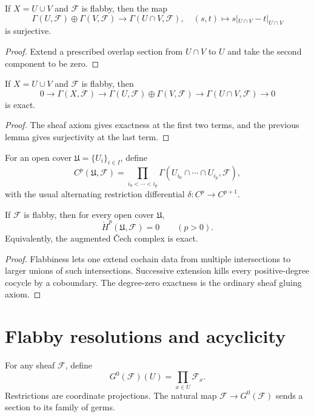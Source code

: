\begin{lemma}\label{lemma:vi46-two-open-surj}
If $X=U\cup V$ and $\mathcal F$ is flabby, then the map
\[
\Gamma(U,\mathcal F)\oplus\Gamma(V,\mathcal F)
\longrightarrow\Gamma(U\cap V,\mathcal F),
\quad (s,t)\longmapsto s|_{U\cap V}-t|_{U\cap V}
\]
is surjective.
\begin{proof}
Extend a prescribed overlap section from $U\cap V$ to $U$ and take the second component to be zero.
\end{proof}
\end{lemma}


\begin{proposition}\label{prop:vi46-two-open}
If $X=U\cup V$ and $\mathcal F$ is flabby, then
\[
0\to\Gamma(X,\mathcal F)
\to\Gamma(U,\mathcal F)\oplus\Gamma(V,\mathcal F)
\to\Gamma(U\cap V,\mathcal F)\to0
\]
is exact.
\begin{proof}
The sheaf axiom gives exactness at the first two terms, and the previous lemma gives surjectivity at the last term.
\end{proof}
\end{proposition}

\begin{definition}\label{def:vi46-cech}
For an open cover $\mathfrak U=\{U_i\}_{i\in I}$, define
\[
C^p(\mathfrak U,\mathcal F)
=
\prod_{i_0<\cdots<i_p}
\Gamma(U_{i_0}\cap\cdots\cap U_{i_p},\mathcal F),
\]
with the usual alternating restriction differential $\delta:C^p\to C^{p+1}$.
\end{definition}


\begin{theorem}\label{thm:vi46-cech-vanish}
If $\mathcal F$ is flabby, then for every open cover $\mathfrak U$,
\[
\check H^p(\mathfrak U,\mathcal F)=0
\qquad (p>0).
\]
Equivalently, the augmented \v{C}ech complex is exact.
\begin{proof}
Flabbiness lets one extend cochain data from multiple intersections to larger unions of such intersections. Successive extension kills every positive-degree cocycle by a coboundary. The degree-zero exactness is the ordinary sheaf gluing axiom.
\end{proof}
\end{theorem}

\section{Flabby resolutions and acyclicity}
\begin{definition}\label{def:vi46-godement-zero}
For any sheaf $\mathcal F$, define
\[
G^0(\mathcal F)(U)=\prod_{x\in U}\mathcal F_x.
\]
Restrictions are coordinate projections. The natural map $\mathcal F\to G^0(\mathcal F)$ sends a section to its family of germs.
\end{definition}

